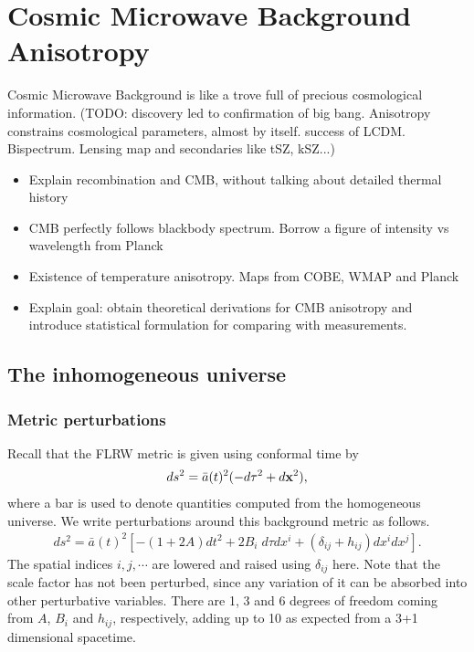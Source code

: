 
\chapter{Cosmic Microwave Background Anisotropy}

\ifpdf
    \graphicspath{{Chapter2/Figs/Raster/}{Chapter2/Figs/PDF/}{Chapter2/Figs/}}
\else
    \graphicspath{{Chapter2/Figs/Vector/}{Chapter2/Figs/}}
\fi

Cosmic Microwave Background is like a trove full of precious cosmological information.
(TODO: discovery led to confirmation of big bang. Anisotropy constrains cosmological parameters, almost by itself. success of LCDM. Bispectrum. Lensing map and secondaries like tSZ, kSZ...)



\begin{itemize}
	\item Explain recombination and CMB, without talking about detailed thermal history 
	\item CMB perfectly follows blackbody spectrum. Borrow a figure of intensity vs wavelength from Planck
	\item Existence of temperature anisotropy. Maps from COBE, WMAP and Planck
	\item Explain goal: obtain theoretical derivations for CMB anisotropy and introduce statistical formulation for comparing with measurements.	
\end{itemize}

\section{The inhomogeneous universe}

\subsection{Metric perturbations}
Recall that the FLRW metric is given using conformal time by
\begin{align}
	ds^2 = \bar{a}(t)^2 (-d\tau^2 + d\mathbf{x}^2),
\end{align}
where a bar is used to denote quantities computed from the homogeneous universe. We write perturbations around this background metric as follows.
\begin{align}
	ds^2 = \bar{a}(t)^2 \left[ -(1+2A) dt^2 + 2B_i \; d\tau dx^i + (\delta_{ij} + h_{ij}) dx^i dx^j \right].
\end{align}
The spatial indices $i,j,\cdots$ are lowered and raised using $\delta_{ij}$ here. Note that the scale factor has not been perturbed, since any variation of it can be absorbed into other perturbative variables. There are 1, 3 and 6 degrees of freedom coming from $A$, $B_i$ and $h_{ij}$, respectively, adding up to 10 as expected from a 3+1 dimensional spacetime.

